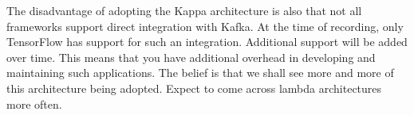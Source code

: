 The disadvantage of adopting the Kappa architecture is also that not all frameworks support direct integration with Kafka.
At the time of recording, only TensorFlow has support for such an integration.
Additional support will be added over time.
This means that you have additional overhead in developing and maintaining such applications.
The belief is that we shall see more and more of this architecture being adopted.
Expect to come across lambda architectures more often.



